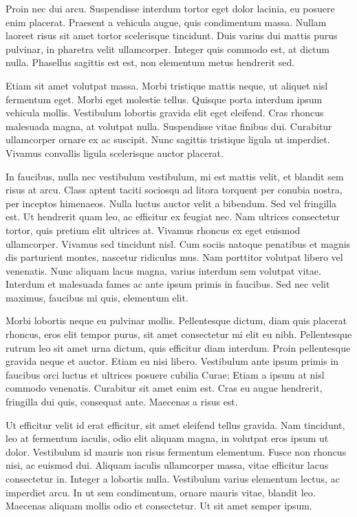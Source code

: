 \documentclass[landscape]{book}
\begin{document}
Proin nec dui arcu. Suspendisse interdum tortor eget dolor lacinia, eu posuere enim placerat. Praesent a vehicula augue, quis condimentum massa. Nullam laoreet risus sit amet tortor scelerisque tincidunt. Duis varius dui mattis purus pulvinar, in pharetra velit ullamcorper. Integer quis commodo est, at dictum nulla. Phasellus sagittis est est, non elementum metus hendrerit sed.

Etiam sit amet volutpat massa. Morbi tristique mattis neque, ut aliquet nisl fermentum eget. Morbi eget molestie tellus. Quisque porta interdum ipsum vehicula mollis. Vestibulum lobortis gravida elit eget eleifend. Cras rhoncus malesuada magna, at volutpat nulla. Suspendisse vitae finibus dui. Curabitur ullamcorper ornare ex ac suscipit. Nunc sagittis tristique ligula ut imperdiet. Vivamus convallis ligula scelerisque auctor placerat.

In faucibus, nulla nec vestibulum vestibulum, mi est mattis velit, et blandit sem risus at arcu. Class aptent taciti sociosqu ad litora torquent per conubia nostra, per inceptos himenaeos. Nulla luctus auctor velit a bibendum. Sed vel fringilla est. Ut hendrerit quam leo, ac efficitur ex feugiat nec. Nam ultrices consectetur tortor, quis pretium elit ultrices at. Vivamus rhoncus ex eget euismod ullamcorper. Vivamus sed tincidunt nisl. Cum sociis natoque penatibus et magnis dis parturient montes, nascetur ridiculus mus. Nam porttitor volutpat libero vel venenatis. Nunc aliquam lacus magna, varius interdum sem volutpat vitae. Interdum et malesuada fames ac ante ipsum primis in faucibus. Sed nec velit maximus, faucibus mi quis, elementum elit.

Morbi lobortis neque eu pulvinar mollis. Pellentesque dictum, diam quis placerat rhoncus, eros elit tempor purus, sit amet consectetur mi elit eu nibh. Pellentesque rutrum leo sit amet urna dictum, quis efficitur diam interdum. Proin pellentesque gravida neque et auctor. Etiam eu nisi libero. Vestibulum ante ipsum primis in faucibus orci luctus et ultrices posuere cubilia Curae; Etiam a ipsum at nisl commodo venenatis. Curabitur sit amet enim est. Cras eu augue hendrerit, fringilla dui quis, consequat ante. Maecenas a risus est.

Ut efficitur velit id erat efficitur, sit amet eleifend tellus gravida. Nam tincidunt, leo at fermentum iaculis, odio elit aliquam magna, in volutpat eros ipsum ut dolor. Vestibulum id mauris non risus fermentum elementum. Fusce non rhoncus nisi, ac euismod dui. Aliquam iaculis ullamcorper massa, vitae efficitur lacus consectetur in. Integer a lobortis nulla. Vestibulum varius elementum lectus, ac imperdiet arcu. In ut sem condimentum, ornare mauris vitae, blandit leo. Maecenas aliquam mollis odio et consectetur. Ut sit amet semper ipsum.
\end{document}
